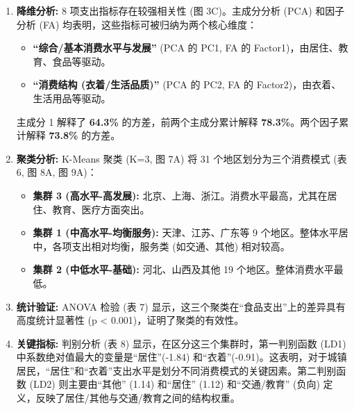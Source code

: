 \documentclass[12pt, a4paper]{article}
\begin{document}
\begin{enumerate}
    \item \textbf{降维分析:} 8 项支出指标存在较强相关性 (图 3C)。主成分分析 (PCA) 和因子分析 (FA) 均表明，这些指标可被归纳为两个核心维度：
    \begin{itemize}
        \item \textbf{“综合/基本消费水平与发展”} (PCA 的 PC1, FA 的 Factor1)，由居住、教育、食品等驱动。
        \item \textbf{“消费结构 (衣着/生活品质)”} (PCA 的 PC2, FA 的 Factor2)，由衣着、生活用品等驱动。
    \end{itemize}
    \noindent 主成分 1 解释了 \textbf{64.3\%} 的方差，前两个主成分累计解释 \textbf{78.3\%}。两个因子累计解释 \textbf{73.8\%} 的方差。

    \item \textbf{聚类分析:} K-Means 聚类 (K=3, 图 7A) 将 31 个地区划分为三个消费模式 (表 6, 图 8A, 图 9A)：
    \begin{itemize}
        \item \textbf{集群 3 (高水平-高发展):} 北京、上海、浙江。消费水平最高，尤其在居住、教育、医疗方面突出。
        \item \textbf{集群 1 (中高水平-均衡服务):} 天津、江苏、广东等 9 个地区。整体水平居中，各项支出相对均衡，服务类 (如交通、其他) 相对较高。
        \item \textbf{集群 2 (中低水平-基础):} 河北、山西及其他 19 个地区。整体消费水平最低。
    \end{itemize}

    \item \textbf{统计验证:} ANOVA 检验 (表 7) 显示，这三个聚类在“食品支出”上的差异具有高度统计显著性 (p < 0.001)，证明了聚类的有效性。

    \item \textbf{关键指标:} 判别分析 (表 8) 显示，在区分这三个集群时，第一判别函数 (LD1) 中系数绝对值最大的变量是“居住”(-1.84) 和“衣着”(-0.91)。这表明，对于城镇居民，“居住”和“衣着”支出水平是划分不同消费模式的关键因素。第二判别函数 (LD2) 则主要由“其他” (1.14) 和“居住” (1.12) 和“交通/教育” (负向) 定义，反映了居住/其他与交通/教育之间的结构权重。
\end{enumerate}
\end{document}
